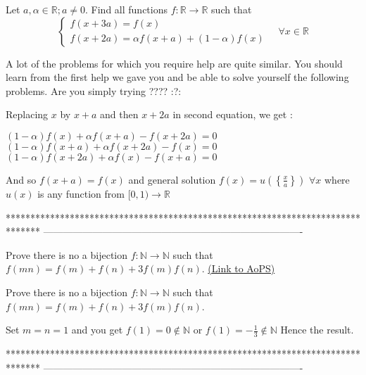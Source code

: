 \begin{solution}
	\begin{tcolorbox}Let $a,\alpha \in\mathbb R;a\neq 0$. Find all functions $f:\mathbb R\to \mathbb R$ such that \[\begin{cases}f(x+3a)=f(x)\\f(x+2a)=\alpha f(x+a)+(1-\alpha)f(x)\end{cases}\quad \forall x\in\mathbb R\]\end{tcolorbox}
A lot of the problems for which you  require help are quite similar. You should learn from the first help we gave you and be able to solve yourself the following problems. Are you simply trying ???? :?:

Replacing $x$ by $x+a$ and then $x+2a$ in second equation, we get :

$(1-\alpha)f(x)+\alpha f(x+a)-f(x+2a)=0$
$(1-\alpha)f(x+a)+\alpha f(x+2a)-f(x)=0$
$(1-\alpha)f(x+2a)+\alpha f(x)-f(x+a)=0$

And so $f(x+a)=f(x)$ and general solution $\boxed{f(x)=u(\left\{\frac xa\right\})}$ $\forall x$ where $u(x)$ is any function from $[0,1)\to\mathbb R$
\end{solution}
*******************************************************************************
-------------------------------------------------------------------------------

\begin{problem}
	Prove there is no a bijection $f: \mathbb{N}\to\mathbb{N}$ such that $f(mn)=f(m)+f(n)+3f(m)f(n)$.
	\flushright \href{https://artofproblemsolving.com/community/c6h569544}{(Link to AoPS)}
\end{problem}



\begin{solution}
	\begin{tcolorbox}Prove there is no a bijection $f: \mathbb{N}\to\mathbb{N}$ such that $f(mn)=f(m)+f(n)+3f(m)f(n)$.\end{tcolorbox}
Set $m=n=1$ and you get $f(1)=0\notin \mathbb N$ or $f(1)=-\frac 13\notin\mathbb N$
Hence the result.
\end{solution}
*******************************************************************************
-------------------------------------------------------------------------------

